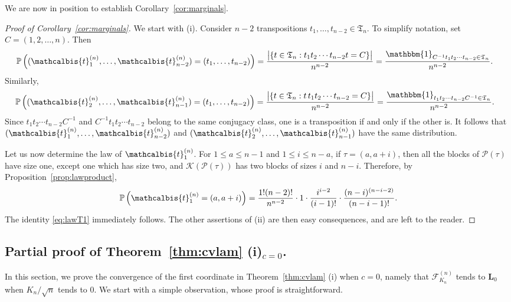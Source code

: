 \documentclass[AHL,XML,longabstracts,Unicode]{cedram}
\def\PPP{\mathcal P}
\def\FKn{\mathcal{F}^{(n)}_{K_{n}}}
\def\tb{\mathcalbis{t}}
\renewcommand\Pr[1]{\mathbb{P}\left(#1\right)}
\begin{document}
We are now in position to establish Corollary~\ref{cor:marginals}.

\begin{proof}[Proof of Corollary~\ref{cor:marginals}]
We start with (i). Consider $n-2$ transpositions $t_{1}, \ldots,t_{n-2} \in \mathfrak{T}_{n}$. To simplify notation, set $C=(1,2,\ldots,n)$. Then
\[\hspace{-3mm}\Pr{(\tb_{1}^{(n)}, \ldots, \tb_{n-2}^{(n)})=(t_{1}, \ldots,t_{n-2})}= \frac{\big| \{t \in \mathfrak{T}_{n} : t_{1}t_{2} \cdots t_{n-2} t= C\}\big| }{n^{n-2}}= \frac{\mathbbm{1}_{C^{-1} t_{1}t_{2} \cdots t_{n-2} \in \mathfrak{T}_{n}} }{n^{n-2}}.\]
Similarly,
\[\hspace{-3mm}\Pr{(\tb_{2}^{(n)}, \ldots, \tb_{n-1}^{(n)})=(t_{1}, \ldots,t_{n-2})}= \frac{\big| \{t \in \mathfrak{T}_{n} : t \, t_{1}t_{2} \cdots t_{n-2}= C\}\big| }{n^{n-2}}= \frac{\mathbbm{1}_{ t_{1}t_{2} \cdots t_{n-2}  C^{-1}\in \mathfrak{T}_{n}} }{n^{n-2}}.\]
Since $t_{1}t_{2} \cdots t_{n-2}  C^{-1}$ and $ C^{-1} t_{1}t_{2} \cdots t_{n-2}$ belong to the same conjugacy class, one is a transposition if and only if the other is. It follows that $(\tb_{1}^{(n)}, \ldots, \tb_{n-2}^{(n)})$ and $(\tb_{2}^{(n)}, \ldots, \tb^{(n)}_{n-1})$ have the same distribution.

Let us now determine the law of $ \tb_{1}^{(n)}$.   For $1 \leq a  \leq n-1$ and $ 1 \leq i \leq n-a$, if $\tau=(a,a+i)$, then all the blocks of $ \PPP(\tau)$ have size one, except one which has size two, and $ \mathcal{K}( \PPP(\tau))$ has two blocks of sizes $i$ and $n-i$. Therefore, by Proposition~\ref{prop:lawproduct},
\[\Pr{\tb_{1}^{(n)}=(a,a+i)}= \frac{1!(n-2)!}{n^{n-2}} \cdot 1 \cdot \frac{i^{i-2}}{(i-1)!} \cdot \frac{(n-i)^{(n-i-2)}}{(n-i-1)!}.\]
The identity \eqref{eq:lawT1} immediately follows. The other assertions  of (ii) are then easy consequences, and are left to the reader.
\end{proof}

\subsection{Partial proof of Theorem~\ref{thm:cvlam} (i)\texorpdfstring{$_{c=0}$}{c=0}.}
\label{ssec:partialproof}

In this section, we prove the convergence of the first coordinate in Theorem~\ref{thm:cvlam} (i) when $c=0$,
namely that $\FKn$ tends to $\mathbf L_0$ when $K_n/\sqrt{n}$ tends to $0$.
We start with a simple observation, whose proof is straightforward.
\end{document}
